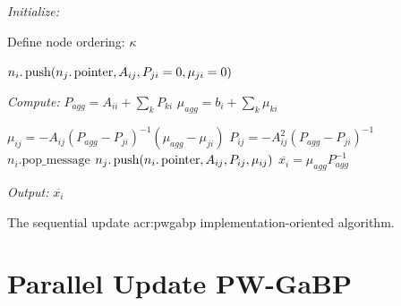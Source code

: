 \begin{algorithm}[h]
	\centering
	\begin{algorithmic}[1]

		\STATE \textit{Initialize: }

		\STATE Define node ordering: $ \kappa $


		\STATE $n_i. \operatorname{push} (n_j. \operatorname{pointer} ,A_{ij}, P_{ji} = 0, \mu_{ji} = 0) $
	\ENDIF

\ENDFOR

\STATE \textit{Compute: }
\REPEAT[iterations]
\STATE $ P_{agg} = A_{ii} + \sum_{k} P_{ki}$
\STATE $ \mu_{agg} = b_{i} + \sum_{k} \mu_{ki}$

\STATE $\mu_{ij} = -A_{ij} (P_{agg} - P_{ji})^{-1} (\mu_{agg} - \mu_{ji}) $
\STATE $P_{ij} = -A_{ij}^2 (P_{agg} - P_{ji})^{-1} $
\STATE $n_i.\text{pop\_message}$
\STATE $n_j. \operatorname{push} (n_i. \operatorname{pointer} ,A_{ij}, P_{ij}, \mu_{ij})$
\ENDFOR
\STATE $\overline{x_i} = \mu_{agg} P_{agg}^{-1}$

\ENDFOR
{}
\STATE \textit{Output:} $\overline{x_{i}}$
\end{algorithmic}

\caption{The sequential update \acrshort{acr:pwgabp} implementation-oriented algorithm.}
\label{alg:seq_gabp}
\end{algorithm}

\section{Parallel Update PW-GaBP}
\label{sec:pus}

